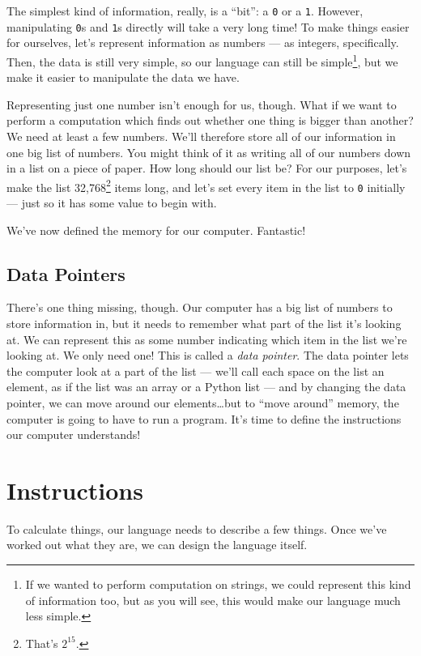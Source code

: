 \documentclass[12pt,draft]{article}
\begin{document}
The simplest kind of information, really, is a ``bit'': a \verb|0| or a
\verb|1|. However, manipulating \verb|0|s and \verb|1|s directly will take a
very long time! To make things easier for ourselves, let's represent information
as numbers --- as integers, specifically. Then, the data is still very simple,
so our language can still be simple\footnote{If we wanted to perform computation
  on strings, we could represent this kind of information too, but as you will
  see, this would make our language much less simple.}, but we make it easier to
manipulate the data we have.\par

Representing just one number isn't enough for us, though. What if we want to
perform a computation which finds out whether one thing is bigger than another?
We need at least a few numbers. We'll therefore store all of our information in
one big list of numbers. You might think of it as writing all of our numbers
down in a list on a piece of paper. How long should our list be? For our
purposes, let's make the list 32,768\footnote{That's $2^{15}$.} items long, and let's set every item in the
list to \verb|0| initially --- just so it has some value to begin with.\par

We've now defined the memory for our computer. Fantastic!\par

\subsection{Data Pointers}

There's one thing missing, though. Our computer has a big list of numbers to
store information in, but it needs to remember what part of the list it's
looking at. We can represent this as some number indicating which item in the
list we're looking at. We only need one! This is called a \emph{data pointer}.
The data pointer lets the computer look at a part of the list --- we'll call
each space on the list an element, as if the list was an array or a Python list
--- and by changing the data pointer, we can move around our elements\ldots{}but
to ``move around'' memory, the computer is going to have to run a program. It's
time to define the instructions our computer understands!\par

\section{Instructions}
To calculate things, our language needs to describe a few things. Once we've
worked out what they are, we can design the language itself.\par
\end{document}
